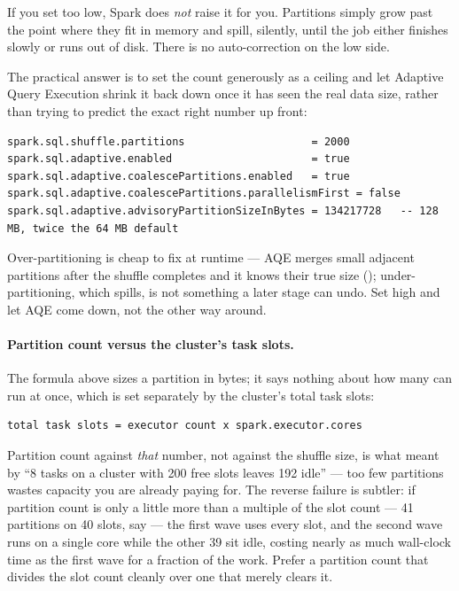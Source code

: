 \begin{warning}
If you set  too low, Spark does
\emph{not} raise it for you. Partitions simply grow past the point where they
fit in memory and spill, silently, until the job either finishes slowly or runs
out of disk. There is no auto-correction on the low side.
\end{warning}

The practical answer is to set the count generously as a ceiling and let
Adaptive Query Execution shrink it back down once it has seen the real data
size, rather than trying to predict the exact right number up front:

\begin{lstlisting}[language=text,numbers=none]
spark.sql.shuffle.partitions                    = 2000
spark.sql.adaptive.enabled                      = true
spark.sql.adaptive.coalescePartitions.enabled   = true
spark.sql.adaptive.coalescePartitions.parallelismFirst = false
spark.sql.adaptive.advisoryPartitionSizeInBytes = 134217728   -- 128 MB, twice the 64 MB default
\end{lstlisting}

Over-partitioning is cheap to fix at runtime --- AQE merges small adjacent
partitions after the shuffle completes and it knows their true size
(); under-partitioning, which spills, is not something a later
stage can undo. Set high and let AQE come down, not the other way around.

\paragraph{Partition count versus the cluster's task slots.} The formula above
sizes a partition in bytes; it says nothing about how many can run at once,
which is set separately by the cluster's total task slots:

\begin{lstlisting}[language=text,numbers=none]
total task slots = executor count x spark.executor.cores
\end{lstlisting}

Partition count against \emph{that} number, not against the shuffle size, is
what  meant by ``8 tasks on a cluster with 200 free slots
leaves 192 idle'' --- too few partitions wastes capacity you are already paying
for. The reverse failure is subtler: if partition count is only a little more
than a multiple of the slot count --- 41 partitions on 40 slots, say --- the
first wave uses every slot, and the second wave runs on a single core while the
other 39 sit idle, costing nearly as much wall-clock time as the first wave for
a fraction of the work. Prefer a partition count that divides the slot count
cleanly over one that merely clears it.


